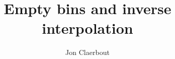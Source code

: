 
\title{Empty bins and inverse interpolation}
\author{Jon Claerbout}
\maketitle

\label{paper:iin}
	
\begin{comment}
\par
Let us review the big picture.
In Chapter \ref{paper:ajt} we developed adjoints and
in Chapter \ref{paper:lsq} we developed inverse operators.
Logically, correct solutions come only through inversion.
Real life, however, seems nearly the opposite.
This is puzzling but intriguing.

\par
Every time you fill your car with gasoline,
it derives much more from the adjoint than from inversion.
I refer to the fact that ``practical seismic data processing''
relates much more to the use of adjoints than of inverses.
It has been widely known for about the last 15 years
that medical imaging and all basic image creation methods are like this.
It might seem that an easy path to fame and profit would
be to introduce the notion of inversion,
but it is not that easy.
Both cost and result quality enter the picture.

\par
First consider cost.
For simplicity, consider a data space with $N$ values
and a model (or image) space of the same size.
The computational cost of applying a dense adjoint
operator increases in direct proportion to the number
of elements in the matrix, in this case $N^2$.
To achieve the minimum discrepancy between theoretical data
and observed data (inversion) theoretically requires $N$ iterations
raising the cost to $N^3$.

\par
Consider an image of size $m\times m=N$.
Continuing, for simplicity, to assume a dense matrix of relations between
model and data,
the cost for the adjoint is $m^4$ whereas the cost for inversion is $m^6$.
We'll consider computational costs for the year 2000, but
noticing that costs go as the sixth power of the mesh size,
the overall situation will not change much in the foreseeable future.
Suppose you give a stiff workout to a powerful machine;
you take an hour to invert a $4096\times 4096$ matrix.
The solution, a vector of $4096$ components could
be laid into an image of size $64\times 64= 2^6\times 2^6 = 4096$.
Here is what we are looking at for costs:


\end{comment}
